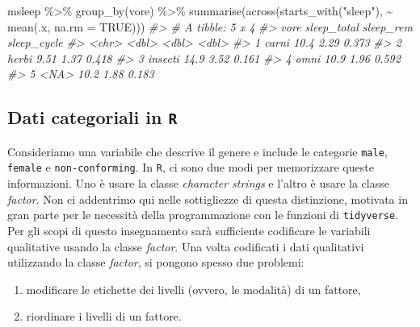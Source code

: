 \documentclass[
  10pt,
  italian,
  a4paper,
  extrafontsizes,onecolumn,openright
  ]{memoir}
\newenvironment{Shaded}{\begin{snugshade}}{\end{snugshade}}
\newcommand{\AttributeTok}[1]{\textcolor[rgb]{0.77,0.63,0.00}{#1}}
\newcommand{\CommentTok}[1]{\textcolor[rgb]{0.56,0.35,0.01}{\textit{#1}}}
\newcommand{\ConstantTok}[1]{\textcolor[rgb]{0.00,0.00,0.00}{#1}}
\newcommand{\FunctionTok}[1]{\textcolor[rgb]{0.00,0.00,0.00}{#1}}
\newcommand{\NormalTok}[1]{#1}
\newcommand{\SpecialCharTok}[1]{\textcolor[rgb]{0.00,0.00,0.00}{#1}}
\newcommand{\StringTok}[1]{\textcolor[rgb]{0.31,0.60,0.02}{#1}}
\providecommand{\tightlist}{%
  \setlength{\itemsep}{0pt}\setlength{\parskip}{0pt}}
\begin{document}
\begin{Shaded}
\begin{Highlighting}[]
\NormalTok{msleep }\SpecialCharTok{\%\textgreater{}\%}
  \FunctionTok{group\_by}\NormalTok{(vore) }\SpecialCharTok{\%\textgreater{}\%}
  \FunctionTok{summarise}\NormalTok{(}\FunctionTok{across}\NormalTok{(}\FunctionTok{starts\_with}\NormalTok{(}\StringTok{"sleep"}\NormalTok{), }\SpecialCharTok{\textasciitilde{}} \FunctionTok{mean}\NormalTok{(.x, }\AttributeTok{na.rm =} \ConstantTok{TRUE}\NormalTok{)))}
\CommentTok{\#\textgreater{} \# A tibble: 5 x 4}
\CommentTok{\#\textgreater{}   vore    sleep\_total sleep\_rem sleep\_cycle}
\CommentTok{\#\textgreater{}   \textless{}chr\textgreater{}         \textless{}dbl\textgreater{}     \textless{}dbl\textgreater{}       \textless{}dbl\textgreater{}}
\CommentTok{\#\textgreater{} 1 carni         10.4       2.29       0.373}
\CommentTok{\#\textgreater{} 2 herbi          9.51      1.37       0.418}
\CommentTok{\#\textgreater{} 3 insecti       14.9       3.52       0.161}
\CommentTok{\#\textgreater{} 4 omni          10.9       1.96       0.592}
\CommentTok{\#\textgreater{} 5 \textless{}NA\textgreater{}          10.2       1.88       0.183}
\end{Highlighting}
\end{Shaded}

\hypertarget{dati-categoriali-in-r}{%
\subsection{\texorpdfstring{Dati categoriali in \texttt{R}}{Dati categoriali in R}}\label{dati-categoriali-in-r}}

Consideriamo una variabile che descrive il genere e include le categorie \texttt{male}, \texttt{female} e \texttt{non-conforming}. In \texttt{R}, ci sono due modi per memorizzare queste informazioni. Uno è usare la classe \emph{character strings} e l'altro è usare la classe \emph{factor}. Non ci addentrimo qui nelle sottigliezze di questa distinzione, motivata in gran parte per le necessità della programmazione con le funzioni di \texttt{tidyverse}. Per gli scopi di questo insegnamento sarà sufficiente codificare le variabili qualitative usando la classe \emph{factor}. Una volta codificati i dati qualitativi utilizzando la classe \emph{factor}, si pongono spesso due problemi:

\begin{enumerate}
\def\labelenumi{\arabic{enumi}.}
\tightlist
\item
  modificare le etichette dei livelli (ovvero, le modalità) di un fattore,
\item
  riordinare i livelli di un fattore.
\end{enumerate}
\end{document}
